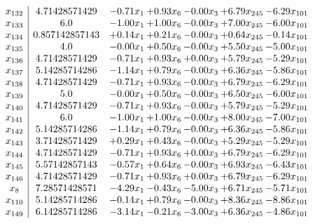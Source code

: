 \documentclass[8pt]{article}
\begin{document}
\[\begin{array}{c| c c@{\hskip 2pt} c@{\hskip 2pt} c@{\hskip 2pt} c@{\hskip 2pt} c@{\hskip 2pt} }
 x_{132}   &  4.71428571429 & -0.71 x_{1} & +  0.93 x_{6} & -0.00 x_{3} & +  6.79 x_{245} & -6.29 x_{101}\\
 x_{133}   &  6.0 & -1.00 x_{1} & +  1.00 x_{6} & -0.00 x_{3} & +  7.00 x_{245} & -6.00 x_{101}\\
 x_{134}   &  0.857142857143 & +  0.14 x_{1} & +  0.21 x_{6} & -0.00 x_{3} & +  0.64 x_{245} & -0.14 x_{101}\\
 x_{135}   &  4.0 & -0.00 x_{1} & +  0.50 x_{6} & -0.00 x_{3} & +  5.50 x_{245} & -5.00 x_{101}\\
 x_{136}   &  4.71428571429 & -0.71 x_{1} & +  0.93 x_{6} & +  0.00 x_{3} & +  5.79 x_{245} & -5.29 x_{101}\\
 x_{137}   &  5.14285714286 & -1.14 x_{1} & +  0.79 x_{6} & -0.00 x_{3} & +  6.36 x_{245} & -5.86 x_{101}\\
 x_{138}   &  4.71428571429 & -0.71 x_{1} & +  0.93 x_{6} & -0.00 x_{3} & +  6.79 x_{245} & -6.29 x_{101}\\
 x_{139}   &  5.0 & -0.00 x_{1} & +  0.50 x_{6} & -0.00 x_{3} & +  6.50 x_{245} & -6.00 x_{101}\\
 x_{140}   &  4.71428571429 & -0.71 x_{1} & +  0.93 x_{6} & -0.00 x_{3} & +  5.79 x_{245} & -5.29 x_{101}\\
 x_{141}   &  6.0 & -1.00 x_{1} & +  1.00 x_{6} & -0.00 x_{3} & +  8.00 x_{245} & -7.00 x_{101}\\
 x_{142}   &  5.14285714286 & -1.14 x_{1} & +  0.79 x_{6} & -0.00 x_{3} & +  6.36 x_{245} & -5.86 x_{101}\\
 x_{143}   &  3.71428571429 & +  0.29 x_{1} & +  0.43 x_{6} & -0.00 x_{3} & +  5.29 x_{245} & -5.29 x_{101}\\
 x_{144}   &  4.71428571429 & -0.71 x_{1} & +  0.93 x_{6} & +  0.00 x_{3} & +  6.79 x_{245} & -6.29 x_{101}\\
 x_{145}   &  5.57142857143 & -0.57 x_{1} & +  0.64 x_{6} & -0.00 x_{3} & +  6.93 x_{245} & -6.43 x_{101}\\
 x_{146}   &  4.71428571429 & -0.71 x_{1} & +  0.93 x_{6} & +  0.00 x_{3} & +  6.79 x_{245} & -6.29 x_{101}\\
 x_{8}   &  7.28571428571 & -4.29 x_{1} & -0.43 x_{6} & -5.00 x_{3} & +  6.71 x_{245} & -5.71 x_{101}\\
 x_{110}   &  5.14285714286 & -0.14 x_{1} & +  0.79 x_{6} & -0.00 x_{3} & +  8.36 x_{245} & -8.86 x_{101}\\
 x_{149}   &  6.14285714286 & -3.14 x_{1} & -0.21 x_{6} & -3.00 x_{3} & +  6.36 x_{245} & -4.86 x_{101}\\

\end{array}\]
\end{document}

